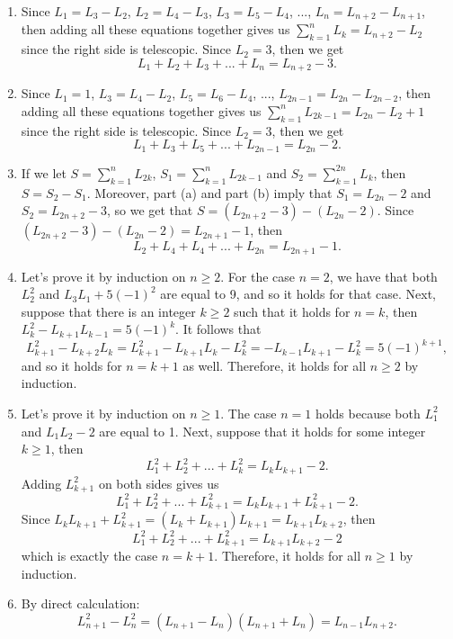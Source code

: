\begin{solution}
    \begin{enumerate}
        \item Since $L_1 = L_3 - L_2$, $L_2 = L_4 - L_3$, $L_3 = L_5 - L_4$, ..., $L_n = L_{n+2} - L_{n+1}$, then adding all these equations together gives us $\sum_{k=1}^{n}L_k = L_{n+2} - L_2$ since the right side is telescopic. Since $L_2 = 3$, then we get 
        $$L_1 + L_2 + L_3 + ... + L_n = L_{n+2} - 3.$$
        \item Since $L_1 = 1$, $L_3 = L_4 - L_2$, $L_5 = L_6 - L_4$, ..., $L_{2n-1} = L_{2n} - L_{2n-2}$, then adding all these equations together gives us $\sum_{k=1}^{n}L_{2k-1} = L_{2n} - L_2 + 1$ since the right side is telescopic. Since $L_2 = 3$, then we get 
        $$L_1 + L_3 + L_5 + ... + L_{2n-1} = L_{2n} - 2.$$
        \item If we let $S = \sum_{k=1}^{n}L_{2k}$, $S_1 = \sum_{k=1}^{n}L_{2k-1}$ and $S_2 = \sum_{k=1}^{2n}L_k$, then $S = S_2 - S_1$. Moreover, part (a) and part (b) imply that $S_1 = L_{2n} - 2$ and $S_2 = L_{2n+2} - 3$, so we get that $S = (L_{2n+2} - 3) - (L_{2n} - 2)$. Since $(L_{2n+2} - 3) - (L_{2n} - 2) = L_{2n+1} - 1$, then 
        $$L_2 + L_4 + L_4 + ...  + L_{2n} = L_{2n+1} - 1.$$
        \item Let's prove it by induction on $n \geq 2$. For the case $n = 2$, we have that both $L_2^2$ and $L_3L_1 + 5(-1)^2$ are equal to 9, and so it holds for that case. Next, suppose that there is an integer $k \geq 2$ such that it holds for $n = k$, then $L_k^2 - L_{k+1}L_{k-1} = 5(-1)^k$. It follows that
        $$L_{k+1}^2 - L_{k+2}L_k = L_{k+1}^2 - L_{k+1}L_k - L_k^2 = -L_{k-1}L_{k+1} - L_k^2 = 5(-1)^{k+1},$$
        and so it holds for $n = k+1$ as well. Therefore, it holds for all $n \geq 2$ by induction.
        \item Let's prove it by induction on $n \geq 1$. The case $n = 1$ holds because both $L_1^2$ and $L_1L_2 - 2$ are equal to 1. Next, suppose that it holds for some integer $k \geq 1$, then
        $$L_1^2 + L_2^2 + ... + L_k^2 = L_kL_{k+1} - 2.$$
        Adding $L_{k+1}^2$ on both sides gives us 
        $$L_1^2 + L_2^2 + ... + L_{k+1}^2 = L_kL_{k+1} + L_{k+1}^2 - 2.$$
        Since $L_kL_{k+1} + L_{k+1}^2 = (L_k + L_{k+1})L_{k+1} = L_{k+1}L_{k+2}$, then 
        $$L_1^2 + L_2^2 + ... + L_{k+1}^2 = L_{k+1}L_{k+2} - 2$$
        which is exactly the case $n = k+1$. Therefore, it holds for all $n \geq 1$ by induction.
        \item By direct calculation:
        $$L_{n+1}^2 - L_n^2 = (L_{n+1} - L_n)(L_{n+1} + L_n) = L_{n-1}L_{n+2}.$$ \\
    \end{enumerate}
\end{solution}


